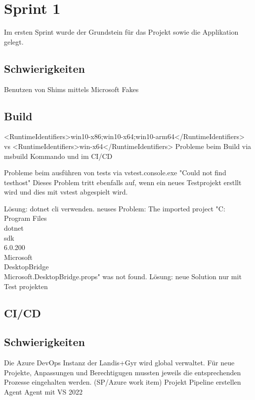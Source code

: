 \section{Sprint 1}
Im ersten Sprint wurde der Grundstein für das Projekt sowie die Applikation gelegt.


\subsection{Schwierigkeiten}
Benutzen von Shims mittels Microsoft Fakes

\subsection{Build}
<RuntimeIdentifiers>win10-x86;win10-x64;win10-arm64</RuntimeIdentifiers> vs <RuntimeIdentifiers>win-x64</RuntimeIdentifiers>
Probleme beim Build via msbuild Kommando und im CI/CD

Probleme beim ausführen von tests via vstest.console.exe
"Could not find testhost"
Dieses Problem tritt ebenfalls auf, wenn ein neues Testprojekt erstllt wird und dies mit vstest abgespielt wird.

Lösung:
dotnet cli verwenden. neuses Problem:  The imported project "C:\\Program Files\\dotnet\\sdk\\6.0.200\\Microsoft\\DesktopBridge\\Microsoft.DesktopBridge.props" was not found.
Lösung:
neue Solution nur mit Test projekten

\subsection{CI/CD}

\subsection{Schwierigkeiten}
Die Azure DevOps Instanz der Landis+Gyr wird global verwaltet. Für neue Projekte, Anpassungen und Berechtigugen mussten jeweils die entsprechenden Prozesse eingehalten werden. (SP/Azure work item)
Projekt
Pipeline erstellen
Agent
Agent mit VS 2022

